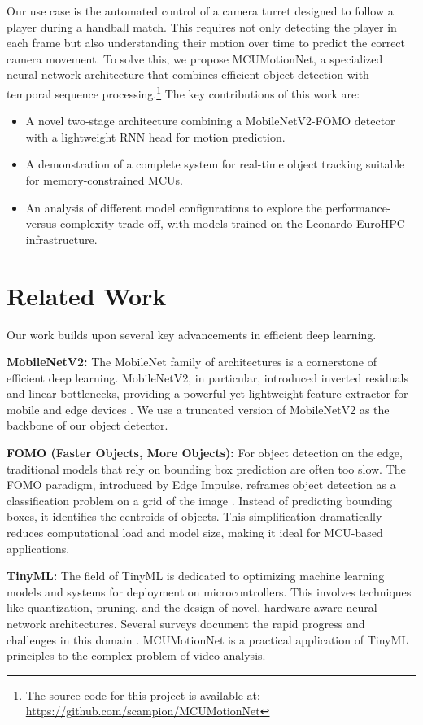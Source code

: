 \documentclass{article}
\begin{document}
Our use case is the automated control of a camera turret designed to follow a player during a handball match. This requires not only detecting the player in each frame but also understanding their motion over time to predict the correct camera movement. To solve this, we propose MCUMotionNet, a specialized neural network architecture that combines efficient object detection with temporal sequence processing.\footnote{The source code for this project is available at: \url{https://github.com/scampion/MCUMotionNet}} The key contributions of this work are:
\begin{itemize}
    \item A novel two-stage architecture combining a MobileNetV2-FOMO detector with a lightweight RNN head for motion prediction.
    \item A demonstration of a complete system for real-time object tracking suitable for memory-constrained MCUs.
    \item An analysis of different model configurations to explore the performance-versus-complexity trade-off, with models trained on the Leonardo EuroHPC infrastructure.
\end{itemize}

\section{Related Work}
Our work builds upon several key advancements in efficient deep learning.

\textbf{MobileNetV2:} The MobileNet family of architectures is a cornerstone of efficient deep learning. MobileNetV2, in particular, introduced inverted residuals and linear bottlenecks, providing a powerful yet lightweight feature extractor for mobile and edge devices \cite{mobilenetv2}. We use a truncated version of MobileNetV2 as the backbone of our object detector.

\textbf{FOMO (Faster Objects, More Objects):} For object detection on the edge, traditional models that rely on bounding box prediction are often too slow. The FOMO paradigm, introduced by Edge Impulse, reframes object detection as a classification problem on a grid of the image \cite{fomo_edgeimpulse}. Instead of predicting bounding boxes, it identifies the centroids of objects. This simplification dramatically reduces computational load and model size, making it ideal for MCU-based applications.

\textbf{TinyML:} The field of TinyML is dedicated to optimizing machine learning models and systems for deployment on microcontrollers. This involves techniques like quantization, pruning, and the design of novel, hardware-aware neural network architectures. Several surveys document the rapid progress and challenges in this domain \cite{tinyml_survey_1, tinyml_survey_2}. MCUMotionNet is a practical application of TinyML principles to the complex problem of video analysis.
\end{document}
